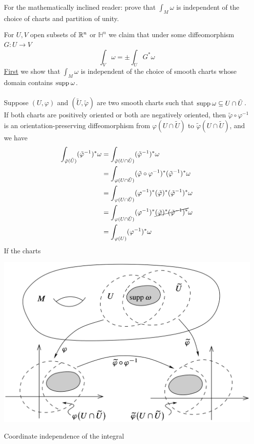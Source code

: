 \documentclass[10pt]{article}
\begin{document}
\begin{example}
	For the mathematically inclined reader: prove that $\int_M \omega$ is independent of the choice of charts and partition of unity.
\end{example}
\sol {}For $U, V$ open subsets of $\mathbb{R}^n$ or $\mathbb{H}^n$ we claim that under some diffeomorphism $G:U \to V$ $$\int_V\omega = \pm \int_U G^*\omega$$\underline{First} we show that $\int_M \omega$ is independent of the choice of smooth charts whose domain contains $\text{supp\:} \omega$.\\\\
Suppose $(U,\varphi)$ and $(\tilde{U},\tilde{\varphi})$ are two smooth charts such that $\text{supp\:} \omega \subseteq U \cap \tilde{U}$. If both charts are positively oriented or both are negatively oriented, then $\tilde{\varphi} \circ \varphi^{-1}$ is an orientation-preserving diffeomorphism from $\varphi(U \cap \tilde{U})$ to $\tilde{\varphi}(U \cap \tilde{U})$, and we have
$$
\begin{aligned}
	\int_{\tilde{\varphi}(\tilde{U})} (\tilde{\varphi}^{-1})^* \omega &= \int_{\tilde{\varphi}(U \cap \tilde{U})} (\tilde{\varphi}^{-1})^* \omega\\
	&= \int_{\varphi(U \cap \tilde{U})} (\tilde{\varphi} \circ \varphi^{-1})^* (\tilde{\varphi}^{-1})^* \omega\\
	&= \int_{\varphi(U \cap \tilde{U})} (\varphi^{-1})^* (\tilde{\varphi})^* (\tilde{\varphi}^{-1})^* \omega\\
	&= \int_{\varphi(U \cap \tilde{U})} (\varphi^{-1})^* \cancel{(\tilde{\varphi})^* (\tilde{\varphi}^{-1})^*} \omega\\
	&= \int_{\varphi(U)} (\varphi^{-1})^* \omega\\
\end{aligned}
$$
If the charts \begin{marginfigure}
	\begin{center}
		\hspace*{-10px}\includegraphics[width=1.5\textwidth]{figs/coord_indep.png}
	\end{center}
	\caption{Coordinate independence of the integral}
\end{marginfigure}
\end{document}
